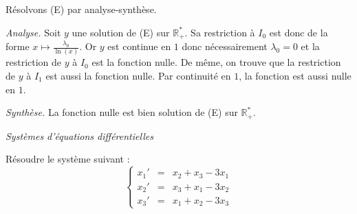 \documentclass[a4paper,10pt]{report}
\begin{document}
\medskip

\noindent Résolvons (E) par analyse-synthèse.

\medskip

\noindent \textit{Analyse.} Soit $y$ une solution de (E) sur $\mathbb R_+^*$. Sa restriction à $I_0$ est donc de la forme $x \mapsto \frac{\lambda_0}{\ln (x)}$. Or $y$ est continue en $1$ donc nécessairement $\lambda_0 = 0$ et la restriction de $y$ à $I_0$ est la fonction nulle. De même, on trouve que la restriction de $y$ à $I_1$ est aussi la fonction nulle. Par continuité en $1$, la fonction est aussi nulle en $1$.

\medskip

\noindent \textit{Synthèse.} La fonction nulle est bien solution de (E) sur $\mathbb R_+^*$. 

\medskip

\begin{center}
\textit{{ {\large Systèmes d'équations différentielles}}}
\end{center}

\medskip

\begin{Exercice}{} Résoudre le système suivant :
$$\left\{\begin{array}{rcl}
x_1' & = & x_2 + x_3 - 3x_1 \\
x_2' & = & x_3 + x_1 -3 x_2 \\
x_3' &= & x_1 + x_2 -3 x_3\end{array}\right.$$
\end{Exercice}
\end{document}
